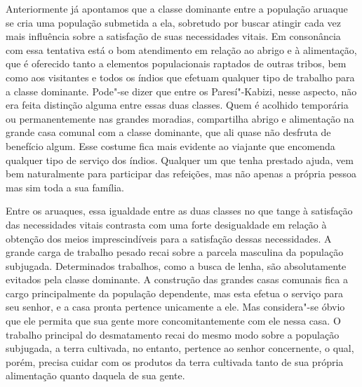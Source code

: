 Anteriormente já apontamos que a classe dominante entre a população
aruaque se cria uma população submetida a ela, sobretudo por buscar
atingir cada vez mais influência sobre a satisfação de suas necessidades
vitais. Em consonância com essa tentativa está o bom atendimento em
relação ao abrigo e à alimentação, que é oferecido tanto a elementos
populacionais raptados de outras tribos, bem como aos visitantes e todos
os índios que efetuam qualquer tipo de trabalho para a classe dominante.
Pode"-se dizer que entre os Paresí"-Kabizi, nesse aspecto, não era feita
distinção alguma entre essas duas classes. Quem é acolhido temporária ou
permanentemente nas grandes moradias, compartilha abrigo e alimentação
na grande casa comunal com a classe dominante, que ali quase não
desfruta de benefício algum. Esse costume fica mais evidente ao viajante
que encomenda qualquer tipo de serviço dos índios. Qualquer um que tenha
prestado ajuda, vem bem naturalmente para participar das refeições, mas
não apenas a própria pessoa mas sim toda a sua família.

Entre os aruaques, essa igualdade entre as duas classes no que tange à
satisfação das necessidades vitais contrasta com uma forte desigualdade
em relação à obtenção dos meios imprescindíveis para a satisfação
dessas necessidades. A grande carga de trabalho pesado recai sobre a
parcela masculina da população subjugada. Determinados trabalhos, como a
busca de lenha, são absolutamente evitados pela classe dominante. A
construção das grandes casas comunais fica a cargo principalmente da
população dependente, mas esta efetua o serviço para seu senhor, e a
casa pronta pertence unicamente a ele. Mas considera"-se óbvio que ele
permita que sua gente more concomitantemente com ele nessa casa. O
trabalho principal do desmatamento recai do mesmo modo sobre a
população subjugada, a terra cultivada, no entanto, pertence ao senhor
concernente, o qual, porém, precisa cuidar com os produtos da terra
cultivada tanto de sua própria alimentação quanto daquela de sua gente.

